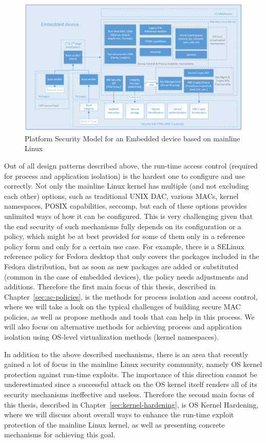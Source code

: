 \begin{figure}[t]
	\centering
		\includegraphics[width=1\textwidth]{figures/LinuxKernelPlatSecModel.png}
	\caption{Platform Security Model for an Embedded device based on mainline Linux}
	\label{fig:platsec}
\end{figure}



Out of all design patterns described above, the run-time access control (required for process and application isolation) is the hardest one to configure and use correctly. Not only the mainline Linux kernel has multiple (and not excluding each other) options, such as traditional UNIX DAC, various MACs, kernel namespaces, POSIX capabilities, seccomp, but each of these options provides unlimited ways of how it can be configured. This is very challenging given that the end security of such mechanisms fully depends on its configuration or a policy, which might be at best provided for some of them only in a reference policy form and only for a certain use case. For example, there is a SELinux reference policy for Fedora desktop that only covers the packages included in the Fedora distribution, but as soon as new packages are added or substituted (common in the case of embedded devices), the policy needs adjustments and additions. Therefore the first main focus of this thesis, described in Chapter~\ref{sec:ac-policies}, is the methods for process isolation and access control, where we will take a look on the typical challenges of building secure MAC policies, as well as propose methods and tools that can help in this process. We will also focus on alternative methods for achieving process and application isolation using OS-level virtualization methods (kernel namespaces). 

In addition to the above described mechanisms, there is an area that recently gained a lot of focus in the mainline Linux security community, namely OS kernel protection against run-time exploits. The importance of this direction cannot be underestimated since a successful attack on the OS kernel itself renders all of its security mechanisms ineffective and useless. Therefore the second main focus of this thesis, described in Chapter~\ref{sec:kernel-hardening}, is OS Kernel Hardening, where we will discuss about overall ways to enhance the run-time exploit protection of the mainline Linux kernel, as well as presenting concrete mechanisms for achieving this goal. 
 